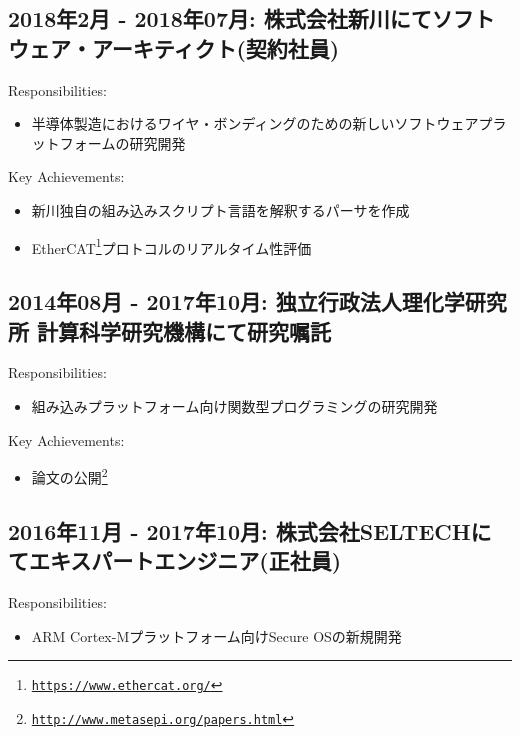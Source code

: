 \documentclass[letterpaper]{article}
\begin{document}
\subsection*{2018年2月 - 2018年07月: 株式会社新川にてソフトウェア・アーキティクト(契約社員)}

\noindent Responsibilities:

\begin{itemize}
  \item 半導体製造におけるワイヤ・ボンディングのための新しいソフトウェアプラットフォームの研究開発
\end{itemize}

\noindent Key Achievements:

\begin{itemize}
  \item 新川独自の組み込みスクリプト言語を解釈するパーサを作成
  \item EtherCAT\footnote{\href{https://www.ethercat.org/}{\tt https://www.ethercat.org/}}プロトコルのリアルタイム性評価
\end{itemize}

\subsection*{2014年08月 - 2017年10月: 独立行政法人理化学研究所 計算科学研究機構にて研究嘱託}

\noindent Responsibilities:

\begin{itemize}
  \item 組み込みプラットフォーム向け関数型プログラミングの研究開発
\end{itemize}

\noindent Key Achievements:

\begin{itemize}
  \item 論文の公開\footnote{\href{http://www.metasepi.org/papers.html}{\tt http://www.metasepi.org/papers.html}}
\end{itemize}

\subsection*{2016年11月 - 2017年10月: 株式会社SELTECHにてエキスパートエンジニア(正社員)}

\noindent Responsibilities:

\begin{itemize}
  \item ARM Cortex-Mプラットフォーム向けSecure OSの新規開発
\end{itemize}
\end{document}
